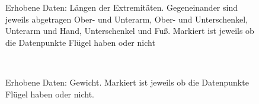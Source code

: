 \begin{figure}
   
   \caption{Erhobene Daten: Längen der Extremitäten. Gegeneinander sind jeweils abgetragen Ober- und Unterarm, Ober- und Unterschenkel, Unterarm und Hand, Unterschenkel und Fuß. Markiert ist jeweils ob die Datenpunkte Flügel haben oder nicht}
   \label{input_data_lengths_wings}
  \end{figure}
 
 \begin{figure}
  \centering
  \\
  
  \caption{Erhobene Daten: Gewicht. Markiert ist jeweils ob die Datenpunkte Flügel haben oder nicht.}
  \label{input_data_weight_wings}
 \end{figure}
 
